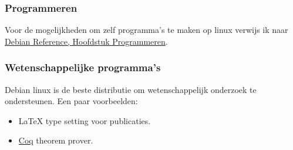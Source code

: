 \subsubsection{Programmeren}
Voor de mogelijkheden om zelf programma's te maken op linux verwijs ik naar \href{https://www.debian.org/doc/manuals/debian-reference/ch12.en.html}{Debian Reference, Hoofdstuk Programmeren}.

\subsubsection{Wetenschappelijke programma's}
Debian linux is de beste distributie om wetenschappelijk onderzoek te ondersteunen. Een paar voorbeelden:

\begin{itemize}
	\item \LaTeX \hspace{0.1cm} type setting voor publicaties.
	\item \href{https://coq.inria.fr/}{Coq} theorem prover.
\end{itemize}

